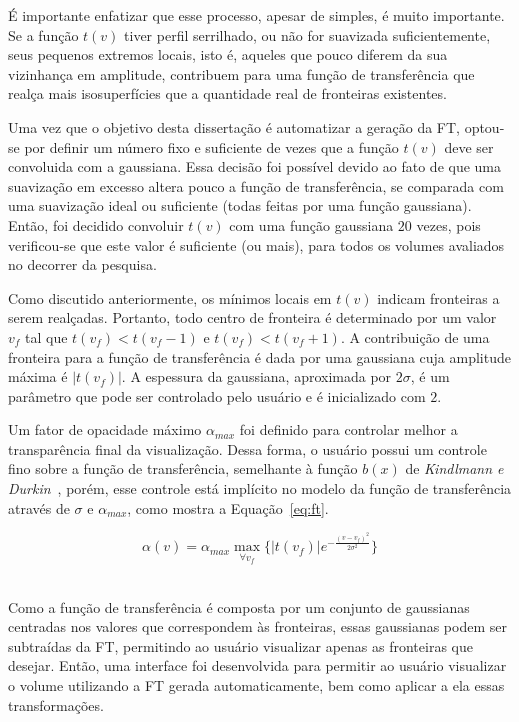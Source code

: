 	É importante enfatizar que esse processo, apesar de simples, é muito importante. Se a função $ t(v) $ tiver perfil serrilhado, ou não for suavizada suficientemente, seus pequenos extremos locais, isto é, aqueles que pouco diferem da sua vizinhança em amplitude, contribuem para uma função de transferência que realça mais isosuperfícies que a quantidade real de fronteiras existentes.

	Uma vez que o objetivo desta dissertação é automatizar a geração da FT, optou-se por definir um número fixo e suficiente de vezes que a função $ t(v) $ deve ser convoluida com a gaussiana. Essa decisão foi possível devido ao fato de que uma suavização em excesso altera pouco a função de transferência, se comparada com uma suavização ideal ou suficiente (todas feitas por uma função gaussiana). Então, foi decidido convoluir $ t(v) $ com uma função gaussiana $ 20 $ vezes, pois verificou-se que este valor é suficiente (ou mais), para todos os volumes avaliados no decorrer da pesquisa.
	
	Como discutido anteriormente, os mínimos locais em $ t(v) $ indicam fronteiras a serem realçadas. Portanto, todo centro de fronteira é determinado por um valor $ v_{f} $ tal que $t(v_{f}) < t(v_{f} - 1)$ e $ t(v_{f}) < t(v_{f} + 1)$. A contribuição de uma fronteira para a função de transferência é dada por uma gaussiana cuja amplitude máxima é $ |t(v_{f})| $. A espessura da gaussiana, aproximada por $ 2\sigma $, é um parâmetro que pode ser controlado pelo usuário e é inicializado com $ 2 $.
	
	Um fator de opacidade máximo $ \alpha_{max} $ foi definido para controlar melhor a transparência final da visualização. Dessa forma, o usuário possui um controle fino sobre a função de transferência, semelhante à função $ b(x) $ de \textit{Kindlmann e Durkin}~\cite{gordon}, porém, esse controle está implícito no modelo da função de transferência através de $ \sigma $ e $ \alpha_{max} $, como mostra a Equação~\eqref{eq:ft}.

\begin{equation} \label{eq:ft}
	\alpha(v) = \alpha_{max}\max_{\forall v_{f}}\big\{|t(v_{f})|e^{-\frac{(v-v_{f})^{2}}{2\sigma^{2}}}\big\}
\end{equation}\

	Como a função de transferência é composta por um conjunto de gaussianas centradas nos valores que correspondem às fronteiras, essas gaussianas podem ser subtraídas da FT, permitindo ao usuário visualizar apenas as fronteiras que desejar. Então, uma interface foi desenvolvida para permitir ao usuário visualizar o volume utilizando a FT gerada automaticamente, bem como aplicar a ela essas transformações.
	
